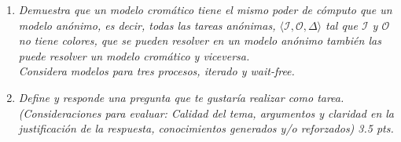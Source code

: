 \documentclass{article}
\begin{document}
\begin{enumerate}
  \item{
      \textsl{
        Demuestra que un modelo cromático tiene el mismo poder de
        cómputo que un modelo anónimo, es decir, todas las tareas
        anónimas, $\langle\mathcal{I},\mathcal{O},\Delta\rangle$ tal
        que $\mathcal{I}$ y $\mathcal{O}$ no tiene colores, que se
        pueden resolver en un modelo anónimo también las puede
        resolver un modelo cromático y viceversa.\\
        Considera modelos para tres procesos, iterado y wait-free.\\
      }
    }

  \item{
    \textsl{
      Define y responde una pregunta que te gustaría realizar como
      tarea. (Consideraciones para evaluar: Calidad del tema,
      argumentos y claridad en la justificación de la respuesta,
      conocimientos generados y/o reforzados) 3.5 pts.\\
    }
  }

\end{enumerate}
\end{document}
